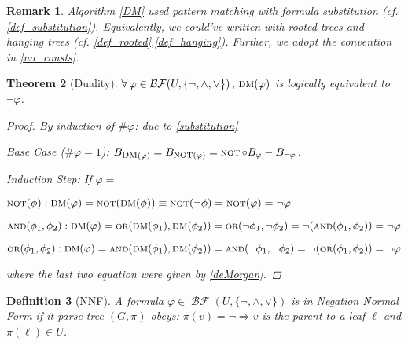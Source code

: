 \documentclass[12pt]{article}
\let\RA\Rightarrow
\let\aand\wedge
\let\oor\vee
\newcommand{\Forall}[1]{\forall\,{#1}\,,\,}
\newcommand{\scr}[1]{{\scriptstyle\textup{#1}}}
\newcommand{\scrf}[1]{{\scriptstyle\textup{\footnotesize #1}}}
\DeclareMathOperator{\BF}{\mathcal{BF}}
\DeclareMathOperator{\NOT}{\scr{NOT}}
\DeclareMathOperator{\OR}{\scr{OR}}
\DeclareMathOperator{\AND}{\scr{AND}}
\newtheorem{theorem}{Theorem}[subsection]
\newtheorem{definition}[theorem]{Definition}
\newtheorem{remark}[theorem]{Remark}
\begin{document}
\begin{remark}
  Algorithm \ref{DM} used pattern matching with formula substitution (cf. \ref{def_substitution}). Equivalently, we could've written with rooted trees and hanging trees (cf. \ref{def_rooted},\ref{def_hanging}). Further, we adopt the convention in \ref{no_consts}.
\end{remark}

\begin{theorem}[Duality]
  $\Forall{\varphi\in\BF(U,\{\neg,\aand,\oor\})}\scrf{DM}(\varphi)$ is logically equivalent to $\neg\varphi$.
  \begin{proof}
    By induction of $\#\varphi$: due to \ref{substitution}
    \begin{compactitem}
      \item Base Case ($\#\varphi=1$): $B_{\scrf{DM}(\varphi)}=B_{\NOT(\varphi)}=\NOT\circ B_\varphi-B_{\neg\varphi}$.
      \item Induction Step: If $\varphi=$ 
      \begin{compactenum}[(i)]
        \item $\NOT(\phi): \scrf{DM}(\varphi)=\NOT(\scrf{DM}(\phi))\equiv \NOT(\neg\phi)=\NOT(\varphi)=\neg\varphi$
        \item $\AND(\phi_1,\phi_2): \scrf{DM}(\varphi)=\OR(\scrf{DM}(\phi_1),\scrf{DM}(\phi_2))=\OR(\neg\phi_1,\neg\phi_2)=\neg(\AND(\phi_1,\phi_2))=\neg\varphi$
        \item $\OR(\phi_1,\phi_2): \scrf{DM}(\varphi)=\AND(\scrf{DM}(\phi_1),\scrf{DM}(\phi_2))=\AND(\neg\phi_1,\neg\phi_2)=\neg(\OR(\phi_1,\phi_2))=\neg\varphi$
      \end{compactenum}
    \end{compactitem}
    where the last two equation were given by \ref{deMorgan}.
  \end{proof}
\end{theorem}

\begin{definition}[NNF]
  \label{def_NNF}
  A formula $\varphi\in\BF(U,\{\neg,\aand,\oor\})$ is in Negation Normal Form if it parse tree $(G,\pi)$ obeys: $\pi(v)=\neg\RA v$ is the parent to a leaf $\ell$ and $\pi(\ell)\in U$.
\end{definition}
\end{document}

